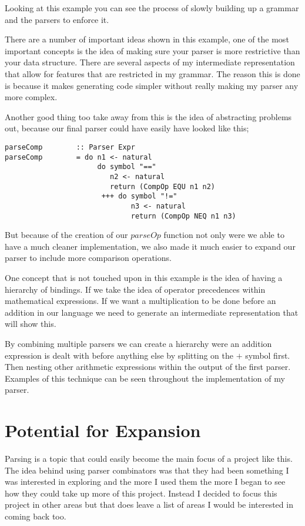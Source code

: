 Looking at this example you can see the process of slowly building up a grammar and the parsers to enforce it.

There are a number of important ideas shown in this example, one of the most important concepts is the idea of making sure your parser is more restrictive than your data structure. There are several aspects of my intermediate representation that allow for features that are restricted in my grammar. The reason this is done is because it makes generating code simpler without really making my parser any more complex.  

Another good thing too take away from this is the idea of abstracting problems out, because our final parser could have easily have looked like this;

\begin{lstlisting}
parseComp        :: Parser Expr	
parseComp        = do n1 <- natural
                      do symbol "==" 
                         n2 <- natural
                         return (CompOp EQU n1 n2)
                       +++ do symbol "!="
                              n3 <- natural
                              return (CompOp NEQ n1 n3)
\end{lstlisting}

But because of the creation of our $parseOp$ function not only were we able to have a much cleaner implementation, we also made it  much easier to expand our parser to include more comparison operations.

One concept that is not touched upon in this example is the idea of having a hierarchy of bindings. If we take the idea of operator precedences within mathematical expressions. If we want a multiplication to be done before an addition in our language we need to generate an intermediate representation that will show this.

By combining multiple parsers we can create a hierarchy were an addition expression is dealt with before anything else by splitting on the $+$ symbol first. Then nesting other arithmetic expressions within the output of the first parser. Examples of this technique can be seen throughout the implementation of my parser.


\section{Potential for Expansion}

Parsing is a topic that could easily become the main focus of a project like this. The idea behind using parser combinators was that they had been something I was interested in exploring and the more I used them the more I began to see how they could take up more of this project. Instead I decided to focus this project in other areas but that does leave a list of areas I would be interested in coming back too. 


